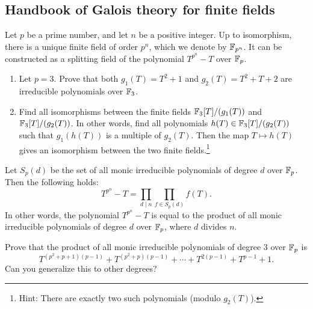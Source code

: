 \newpage

\subsection{Handbook of Galois theory for finite fields}
\label{subsec:handbook_galois_ff}

\begin{theorem}
    Let $p$ be a prime number, and let $n$ be a positive integer.
    Up to isomorphism, there is a unique finite field of order $p^n$, which we denote by $\mathbb{F}_{p^n}$.
    It can be constructed as a splitting field of the polynomial $T^{p^n} - T$ over $\mathbb{F}_p$.
\end{theorem}

\begin{exercise}
    \begin{enumerate}
        \item Let $p = 3$. Prove that both $g_1(T) = T^2 + 1$ and $g_2(T) = T^2 + T + 2$ are irreducible polynomials over $\mathbb{F}_3$.
        \item Find all isomorphisms between the finite fields $\mathbb{F}_3[T] / (g_1(T))$ and $\mathbb{F}_3[T] / (g_2(T))$.
        In other words, find all polynomials $h(T) \in \mathbb{F}_3[T] / (g_2(T))$ such that $g_1(h(T))$ is a multiple of $g_2(T)$.
        Then the map $T \mapsto h(T)$ gives an isomorphism between the two finite fields.\footnote{Hint: There are exactly two such polynomials (modulo $g_2(T)$).}
    \end{enumerate}
\end{exercise}

\begin{theorem}
    Let $S_{p}(d)$ be the set of all monic irreducible polynomials of degree $d$ over $\mathbb{F}_p$.
    Then the following holds:
    \begin{equation}
        T^{p^n} - T = \prod_{d \mid n} \prod_{f \in S_p(d)} f(T).
    \end{equation}
    In other words, the polynomial $T^{p^n} - T$ is equal to the product of all monic irreducible polynomials of degree $d$ over $\mathbb{F}_p$, where $d$ divides $n$.
\end{theorem}

\begin{exercise}
    Prove that the product of all monic irreducible polynomials of degree $3$ over $\mathbb{F}_p$ is
    \[
        T^{(p^2 + p + 1)(p-1)} + T^{(p^2 + p)(p - 1)} + \cdots + T^{2(p-1)} + T^{p-1} + 1.
    \]
    Can you generalize this to other degrees?
\end{exercise}

